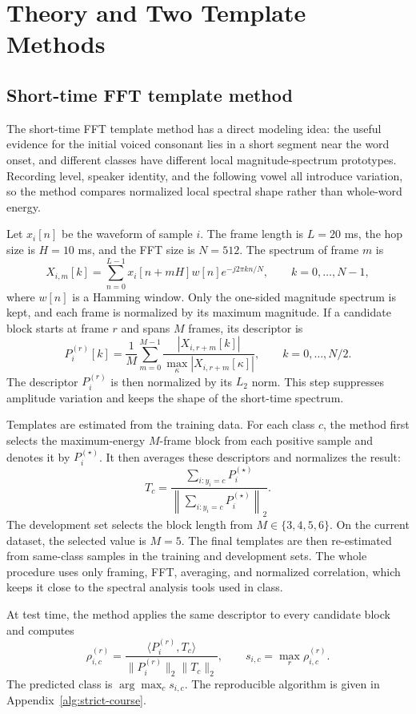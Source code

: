 \section{Theory and Two Template Methods}

\subsection{Short-time FFT template method}

The short-time FFT template method has a direct modeling idea: the useful evidence for the initial voiced consonant lies in a short segment near the word onset, and different classes have different local magnitude-spectrum prototypes. Recording level, speaker identity, and the following vowel all introduce variation, so the method compares normalized local spectral shape rather than whole-word energy.

Let $x_i[n]$ be the waveform of sample $i$. The frame length is $L=20$ ms, the hop size is $H=10$ ms, and the FFT size is $N=512$. The spectrum of frame $m$ is
\[
X_{i,m}[k] = \sum_{n=0}^{L-1} x_i[n+mH]w[n]e^{-j2\pi kn/N},
\qquad k=0,\dots,N-1,
\]
where $w[n]$ is a Hamming window. Only the one-sided magnitude spectrum is kept, and each frame is normalized by its maximum magnitude. If a candidate block starts at frame $r$ and spans $M$ frames, its descriptor is
\[
P_i^{(r)}[k]
=\frac{1}{M}\sum_{m=0}^{M-1}
\frac{|X_{i,r+m}[k]|}{\max_{\kappa}|X_{i,r+m}[\kappa]|},
\qquad k=0,\dots,N/2.
\]
The descriptor $P_i^{(r)}$ is then normalized by its $L_2$ norm. This step suppresses amplitude variation and keeps the shape of the short-time spectrum.

Templates are estimated from the training data. For each class $c$, the method first selects the maximum-energy $M$-frame block from each positive sample and denotes it by $P_i^{(\star)}$. It then averages these descriptors and normalizes the result:
\[
T_c=\frac{\sum_{i:y_i=c}P_i^{(\star)}}
{\left\|\sum_{i:y_i=c}P_i^{(\star)}\right\|_2}.
\]
The development set selects the block length from $M\in\{3,4,5,6\}$. On the current dataset, the selected value is $M=5$. The final templates are then re-estimated from same-class samples in the training and development sets. The whole procedure uses only framing, FFT, averaging, and normalized correlation, which keeps it close to the spectral analysis tools used in class.

At test time, the method applies the same descriptor to every candidate block and computes
\[
\rho_{i,c}^{(r)}
=\frac{\langle P_i^{(r)},T_c\rangle}
{\|P_i^{(r)}\|_2\|T_c\|_2},
\qquad
s_{i,c}=\max_r\rho_{i,c}^{(r)}.
\]
The predicted class is $\arg\max_c s_{i,c}$. The reproducible algorithm is given in Appendix~\ref{alg:strict-course}.

